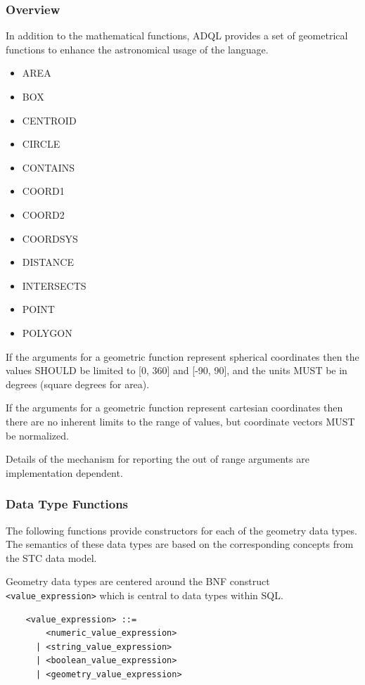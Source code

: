 \documentclass[11pt,a4paper]{ivoa}
\begin{document}
\subsubsection{Overview}
\label{sec:functions.geom.overview}

In addition to the mathematical functions, ADQL provides a set of geometrical
functions to enhance the astronomical usage of the language.

\begin{itemize}
    \item AREA
    \item BOX
    \item CENTROID
    \item CIRCLE
    \item CONTAINS
    \item COORD1
    \item COORD2
    \item COORDSYS
    \item DISTANCE
    \item INTERSECTS
    \item POINT
    \item POLYGON
\end{itemize}

If the arguments for a geometric function represent spherical coordinates
then the values SHOULD be limited to [0, 360] and [-90, 90],
and the units MUST be in degrees (square degrees for area).
            
If the arguments for a geometric function represent cartesian coordinates
then there are no inherent limits to the range of values, but
coordinate vectors MUST be normalized.

Details of the mechanism for reporting the out of range arguments are
implementation dependent.

\subsubsection{Data Type Functions}
\label{sec:functions.geom.type}

The following functions provide constructors for each of the geometry data types.
The semantics of these data types are based on the corresponding
concepts from the STC data model.

Geometry data types are centered around the BNF construct
\verb:<value_expression>: which is central to data types within SQL.

\begin{verbatim}
    <value_expression> ::=
        <numeric_value_expression>
      | <string_value_expression>
      | <boolean_value_expression>
      | <geometry_value_expression>
\end{verbatim}
\end{document}
